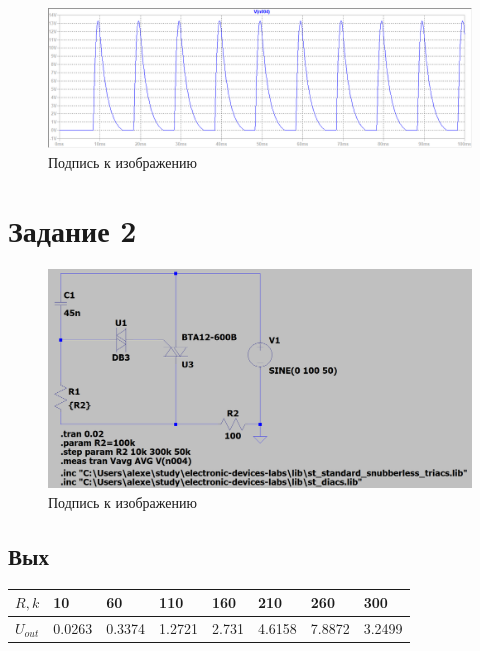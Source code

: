\documentclass[a4paper, 12pt]{article}
\begin{document}
    \begin{figure}[H]
        \centering
        \includegraphics[scale=0.45]{a150_L20m_D.png}
        \captionsetup{skip=0pt}
        \caption{Подпись к изображению}
        \label{fig:a150_L20m_D}
    \end{figure}


    \section{Задание 2}
    \begin{figure}[H]
        \centering
        \includegraphics[scale=0.3]{scheme4.png}
        \captionsetup{skip=0pt}
        \caption{Подпись к изображению}
        \label{fig:scheme4}
    \end{figure}


    \subsection{Вых}
    \begin{center}
        \begin{tabular}{ | m{4em} | m{1.5cm}| m{1.5cm} | m{1.5cm} | m{1.5cm} | m{1.5cm} | m{1.5cm} | m{1.5cm} | } 
        \hline
        $R,k$& 10 & 60 & 110 &160 &210 &260 &300 \\ 
        \hline
        $U_{out}$& 0.0263 & 0.3374 & 1.2721 &2.731 &4.6158 &7.8872 &3.2499\\ 
        \hline
    \end{tabular}
    \end{center}
\end{document}
